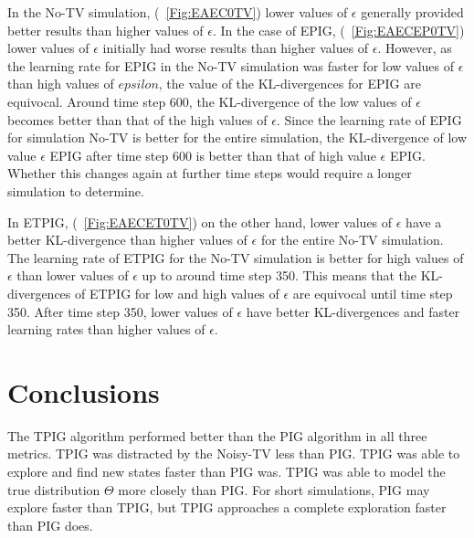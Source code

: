 \documentclass[letterpaper]{article} %
\begin{document}

In the No-TV simulation, (\figurename~\ref{Fig:EAEC0TV}) lower values of $\epsilon$ generally provided better results than higher values of $\epsilon$. In the case of EPIG, (\figurename~\ref{Fig:EAECEP0TV}) lower values of $\epsilon$ initially had worse results than higher values of $\epsilon$. However, as the learning rate for EPIG in the No-TV simulation was faster for low values of $\epsilon$ than high values of $epsilon$, the value of the KL-divergences for EPIG are equivocal. Around time step 600, the KL-divergence of the low values of $\epsilon$ becomes better than that of the high values of $\epsilon$. Since the learning rate of EPIG for simulation No-TV is better for the entire simulation, the KL-divergence of low value $\epsilon$ EPIG after time step 600 is better than that of high value $\epsilon$ EPIG. Whether this changes again at further time steps would require a longer simulation to determine.


In ETPIG, (\figurename~\ref{Fig:EAECET0TV}) on the other hand, lower values of $\epsilon$ have a better KL-divergence than higher values of $\epsilon$ for the entire No-TV simulation. The learning rate of ETPIG for the No-TV simulation is better for high values of $\epsilon$ than lower values of $\epsilon$ up to around time step 350. This means that the KL-divergences of ETPIG for low and high values of $\epsilon$ are equivocal until time step 350. After time step 350, lower values of $\epsilon$ have better KL-divergences and faster learning rates than higher values of $\epsilon$.




\section{Conclusions}
The TPIG algorithm performed better than the PIG algorithm in all three metrics. TPIG was distracted by the Noisy-TV less than PIG. TPIG was able to explore and find new states faster than PIG was. TPIG was able to model the true distribution $\Theta$ more closely than PIG. For short simulations, PIG may explore faster than TPIG, but TPIG approaches a complete exploration faster than PIG does.
\end{document}
